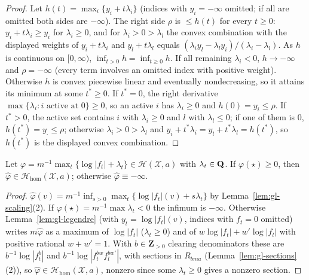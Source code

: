 \begin{proof}
Let $h(t)=\max_i\{y_i+t\lambda_i\}$ (indices with $y_i=-\infty$ omitted; if all are omitted both sides are $-\infty$). The right side $\rho$ is $\le h(t)$ for
every $t\ge0$: $y_i+t\lambda_i\ge y_i$ for $\lambda_i\ge0$, and for $\lambda_i>0>\lambda_l$ the convex combination with the displayed weights of $y_i+t\lambda_i$ and
$y_l+t\lambda_l$ equals $(\lambda_iy_l-\lambda_ly_i)/(\lambda_i-\lambda_l)$. As $h$ is continuous on $[0,\infty)$, $\inf_{t>0}h=\inf_{t\ge0}h$. If all remaining $\lambda_i<0$,
$h\to-\infty$ and $\rho=-\infty$ (every term involves an omitted index with positive weight). Otherwise $h$ is convex piecewise linear and eventually
nondecreasing, so it attains its minimum at some $t^*\ge0$. If $t^*=0$, the right derivative $\max\{\lambda_i:i\text{ active at }0\}\ge0$, so an active $i$ has
$\lambda_i\ge0$ and $h(0)=y_i\le\rho$. If $t^*>0$, the active set contains $i$ with $\lambda_i\ge0$ and $l$ with $\lambda_l\le0$; if one of them is $0$, $h(t^*)=y_\cdot\le\rho$;
otherwise $\lambda_i>0>\lambda_l$ and $y_i+t^*\lambda_i=y_l+t^*\lambda_l=h(t^*)$, so $h(t^*)$ is the displayed convex combination.
\end{proof}

\begin{theorem}\label{thm:gl-homog-fs}
\leanok
{}
Let $\varphi=m^{-1}\max_t\{\log|f_t|+\lambda_t\}\in\mathcal H(\mathcal X,a)$ with $\lambda_t\in\mathbf{Q}$. If $\varphi(\star)\ge0$, then
$\hat\varphi\in\mathcal H_{\mathrm{hom}}(\mathcal X,a)$; otherwise $\hat\varphi\equiv-\infty$.
\end{theorem}

\begin{proof}
$\hat\varphi(v)=m^{-1}\inf_{s>0}\max_t\{\log|f_t|(v)+s\lambda_t\}$ by Lemma~\ref{lem:gl-scaling}(2). If $\varphi(\star)=m^{-1}\max\lambda_t<0$ the infimum is
$-\infty$. Otherwise Lemma~\ref{lem:gl-legendre} (with $y_t=\log|f_t|(v)$, indices with $f_t=0$ omitted) writes $m\hat\varphi$ as a maximum of
$\log|f_t|$ ($\lambda_t\ge0$) and of $w\log|f_t|+w'\log|f_l|$ with positive rational $w+w'=1$. With $b\in\mathbf Z_{>0}$ clearing denominators these are
$b^{-1}\log|f_t^b|$ and $b^{-1}\log|f_t^{bw}f_l^{bw'}|$, with sections in $R_{bma}$ (Lemma~\ref{lem:gl-sections}(2)), so
$\hat\varphi\in\mathcal H_{\mathrm{hom}}(\mathcal X,a)$, nonzero since some $\lambda_t\ge0$ gives a nonzero section.
\end{proof}

